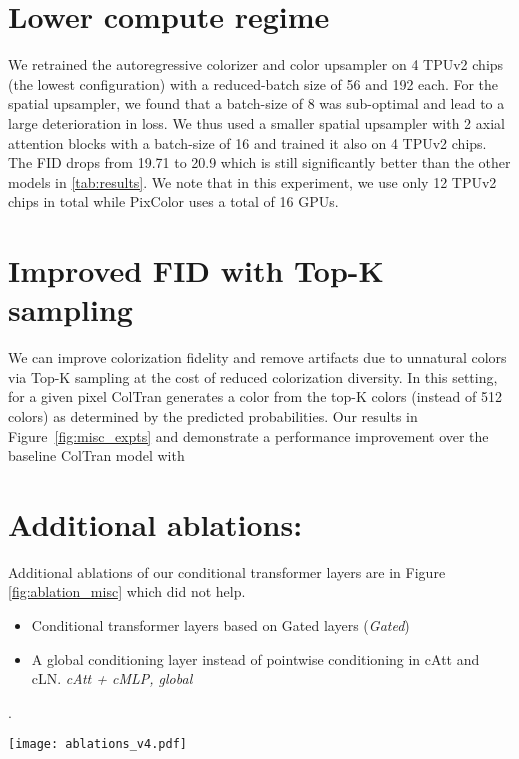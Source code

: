 \documentclass{article} \usepackage{iclr2021_conference,times}
\begin{document}
\section{Lower compute regime}

We retrained the autoregressive colorizer and color upsampler on 4 TPUv2 chips (the lowest configuration) with a reduced-batch size of 56 and 192 each.  For the spatial upsampler, we found that a batch-size of 8 was sub-optimal and lead to a large deterioration in loss. We thus used a smaller spatial upsampler with 2 axial attention blocks with a batch-size of 16 and trained it also on 4 TPUv2 chips.
The FID drops from 19.71 to 20.9 which is still significantly better than the other models in \ref{tab:results}.
We note that in this experiment, we use only 12 TPUv2 chips in total while PixColor \citep{guadarrama2017pixcolor} uses a total of 16 GPUs.

\section{Improved FID with Top-K sampling}
\label{fid:topk}
We can improve colorization fidelity and remove artifacts due to unnatural colors via Top-K sampling at the cost of reduced colorization diversity. In this setting, for a given pixel ColTran generates a color from the top-K colors (instead of 512 colors) as determined by the predicted probabilities. Our results in Figure~\ref{fig:misc_expts}  and  demonstrate a performance improvement over the baseline ColTran model with 

\section{Additional ablations:}

Additional ablations of our conditional transformer layers are in Figure \ref{fig:ablation_misc} which did not help.

\begin{itemize}
    \item Conditional transformer layers based on Gated layers \citep{oord2016pixel} (\textit{Gated})
    \item A global conditioning layer instead of pointwise conditioning in cAtt and cLN. \textit{cAtt + cMLP, global}
\end{itemize}
.

\begin{figure*}
\centering
\texttt{[image: ablations\_v4.pdf]}

\caption{Ablated models. \textit{Gated}: Gated conditioning layers as done in \citep{oord2016pixel} and \textit{cAtt + cMLP, global}: Global conditioning instead of pointwise conditioning in cAtt and cLN.}
\label{fig:ablation_misc}
\end{figure*}
\end{document}
